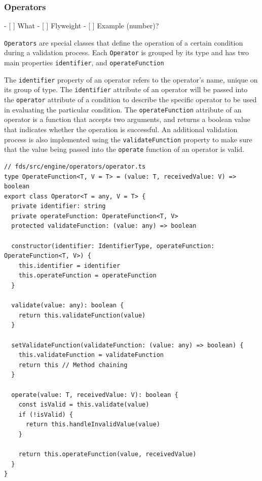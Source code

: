     \subsubsection{Operators}
      - [ ] What
      - [ ] Flyweight
      - [ ] Example (number)?

      \verb;Operators; are special classes that define the operation of a certain condition during a validation process. Each \verb;Operator; is grouped by its type and has two main properties \verb;identifier;, and \verb;operateFunction;
      
      The \verb;identifier; property of an operator refers to the operator's name, unique on its group of type. The \verb;identifier; attribute of an operator will be passed into the \verb;operator; attribute of a condition to describe the specific operator to be used in evaluating the particular condition. The \verb;operateFunction; attribute of an operator is a function that accepts two arguments, and returns a boolean value that indicates whether the operation is successful. An additional validation process is also implemented using the \verb;validateFunction; property to make sure that the value being passed into the \verb;operate; function of an operator is valid.
      
      \begin{lstlisting}[style=es6, caption={The Operator class (TypeScript)}]
// fds/src/engine/operators/operator.ts
type OperateFunction<T, V = T> = (value: T, receivedValue: V) => boolean
export class Operator<T = any, V = T> {
  private identifier: string
  private operateFunction: OperateFunction<T, V>
  protected validateFunction: (value: any) => boolean

  constructor(identifier: IdentifierType, operateFunction: OperateFunction<T, V>) {
    this.identifier = identifier
    this.operateFunction = operateFunction
  }

  validate(value: any): boolean {
    return this.validateFunction(value)
  }

  setValidateFunction(validateFunction: (value: any) => boolean) {
    this.validateFunction = validateFunction
    return this // Method chaining
  }

  operate(value: T, receivedValue: V): boolean {
    const isValid = this.validate(value)
    if (!isValid) {
      return this.handleInvalidValue(value)
    }

    return this.operateFunction(value, receivedValue)
  }
}
      \end{lstlisting}
      
